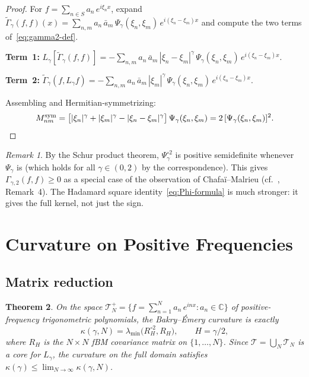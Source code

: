 \documentclass[11pt,a4paper]{article}
\theoremstyle{plain}
\newtheorem{theorem}{Theorem}[section]
\theoremstyle{definition}
\theoremstyle{remark}
\newtheorem{remark}[theorem]{Remark}
\newcommand{\C}{\mathbb{C}}
\begin{document}
\begin{proof}
For $f = \sum_{n \in S} a_n\,e^{i\xi_n x}$, expand
$\widetilde{\Gamma}_\gamma(f,f)(x)
= \sum_{n,m} a_n\,\bar{a}_m\,\Psi_\gamma(\xi_n,\xi_m)\,
  e^{i(\xi_n-\xi_m)x}$
and compute the two terms of~\eqref{eq:gamma2-def}.

\textbf{Term~1:}
$L_\gamma[\widetilde{\Gamma}_\gamma(f,f)] =
-\sum_{n,m} a_n\,\bar{a}_m\,|\xi_n-\xi_m|^\gamma\,
\Psi_\gamma(\xi_n,\xi_m)\,e^{i(\xi_n-\xi_m)x}$.

\textbf{Term~2:}
$\widetilde{\Gamma}_\gamma(f, L_\gamma f) =
-\sum_{n,m} a_n\,\bar{a}_m\,|\xi_m|^\gamma\,
\Psi_\gamma(\xi_n,\xi_m)\,e^{i(\xi_n-\xi_m)x}$.

Assembling and Hermitian-symmetrizing:
\[
  M_{nm}^{\mathrm{sym}}
  = \bigl[|\xi_n|^\gamma + |\xi_m|^\gamma - |\xi_n-\xi_m|^\gamma\bigr]\,
  \Psi_\gamma(\xi_n,\xi_m)
  = 2\,[\Psi_\gamma(\xi_n,\xi_m)]^2. \qedhere
\]
\end{proof}

\begin{remark}\label{rem:hadamard}
By the Schur product theorem, $\Psi_\gamma^{\circ 2}$ is positive
semidefinite whenever $\Psi_\gamma$ is (which holds for all
$\gamma \in (0,2)$ by the correspondence). This gives $\Gamma_{\gamma,2}(f,f) \geq 0$
as a special case of the observation of Chafa\"i--Malrieu
(cf.~\cite{GentilImbert2008}, Remark~4). The Hadamard square
identity~\eqref{eq:Phi-formula} is much stronger: it gives the
full kernel, not just the sign.
\end{remark}


\section{Curvature on Positive Frequencies}\label{sec:curvature}

\subsection{Matrix reduction}\label{sec:curv-pos}

\begin{theorem}\label{thm:curvature}
On the space $\mathcal{T}_N^+ = \{f = \sum_{n=1}^N a_n\,e^{inx} :
a_n \in \C\}$ of positive-frequency trigonometric
polynomials, the Bakry--\'Emery
curvature is exactly
\begin{equation}\label{eq:kappa-def}
  \kappa(\gamma,N) = \lambda_{\min}\!\bigl(R_H^{\circ 2}, R_H\bigr),
  \qquad H = \gamma/2,
\end{equation}
where $R_H$ is the $N \times N$ fBM covariance matrix on $\{1,\ldots,N\}$.
Since $\mathcal{T} = \bigcup_N \mathcal{T}_N$ is a core for $L_\gamma$,
the curvature on the full domain satisfies
$\kappa(\gamma) \leq \lim_{N\to\infty} \kappa(\gamma,N)$.
\end{theorem}
\end{document}
